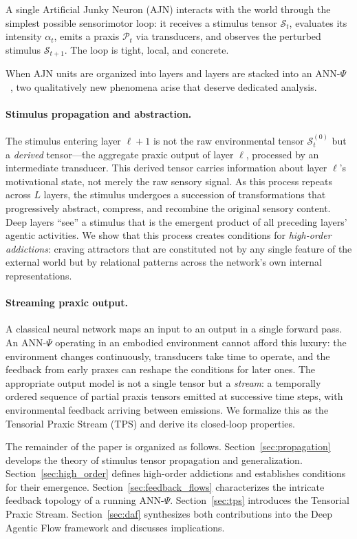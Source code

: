 \documentclass[12pt,a4paper]{article}
\newcommand{\tens}[1]{\boldsymbol{\mathcal{#1}}}
\begin{document}
A single Artificial Junky Neuron (AJN) interacts with the world through the
simplest possible sensorimotor loop: it receives a stimulus tensor $\tens{S}_t$,
evaluates its intensity $\alpha_t$, emits a praxis $\tens{P}_t$ via transducers,
and observes the perturbed stimulus $\tens{S}_{t+1}$. The loop is tight, local,
and concrete.

When AJN units are organized into layers and layers are stacked into an
ANN-$\Psi$~\cite{tapiador2024annpsi}, two qualitatively new phenomena arise that
deserve dedicated analysis.

\paragraph{Stimulus propagation and abstraction.}
The stimulus entering layer $\ell+1$ is not the raw environmental tensor
$\tens{S}_t^{(0)}$ but a \textit{derived} tensor---the aggregate praxic output
of layer $\ell$, processed by an intermediate transducer. This derived tensor
carries information about layer $\ell$'s motivational state, not merely the raw
sensory signal. As this process repeats across $L$ layers, the stimulus undergoes
a succession of transformations that progressively abstract, compress, and
recombine the original sensory content. Deep layers ``see'' a stimulus that is
the emergent product of all preceding layers' agentic activities. We show that
this process creates conditions for \textit{high-order addictions}: craving
attractors that are constituted not by any single feature of the external world
but by relational patterns across the network's own internal representations.

\paragraph{Streaming praxic output.}
A classical neural network maps an input to an output in a single forward pass.
An ANN-$\Psi$ operating in an embodied environment cannot afford this luxury:
the environment changes continuously, transducers take time to operate, and the
feedback from early praxes can reshape the conditions for later ones. The
appropriate output model is not a single tensor but a \textit{stream}: a
temporally ordered sequence of partial praxis tensors emitted at successive time
steps, with environmental feedback arriving between emissions. We formalize this
as the Tensorial Praxic Stream (TPS) and derive its closed-loop properties.

The remainder of the paper is organized as follows.
Section~\ref{sec:propagation} develops the theory of stimulus tensor propagation
and generalization.
Section~\ref{sec:high_order} defines high-order addictions and establishes
conditions for their emergence.
Section~\ref{sec:feedback_flows} characterizes the intricate feedback topology of
a running ANN-$\Psi$.
Section~\ref{sec:tps} introduces the Tensorial Praxic Stream.
Section~\ref{sec:daf} synthesizes both contributions into the Deep Agentic Flow
framework and discusses implications.
\end{document}
